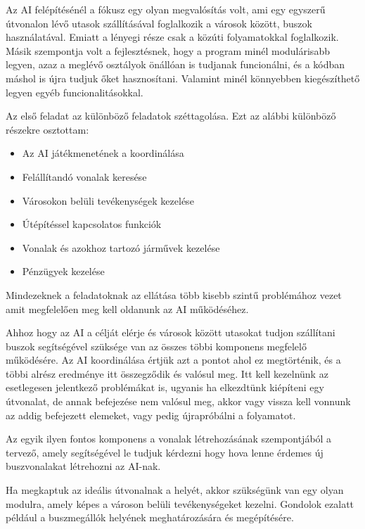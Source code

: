 
Az AI felépítésénél a fókusz egy olyan megvalósítás volt, ami egy egyszerű útvonalon lévő utasok szállításával foglalkozik a városok között, buszok használatával. Emiatt a lényegi része csak a közúti folyamatokkal foglalkozik. Másik szempontja volt a fejlesztésnek, hogy a program minél modulárisabb legyen, azaz a meglévő osztályok önállóan is tudjanak funcionálni, és a kódban máshol is újra tudjuk őket hasznosítani. Valamint minél könnyebben kiegészíthető legyen egyéb funcionalitásokkal.


Az első feladat az különböző feladatok széttagolása. Ezt az alábbi különböző részekre osztottam:

\begin{itemize}
	\item Az AI játékmenetének a koordinálása
	\item Felállítandó vonalak keresése
	\item Városokon belüli tevékenységek kezelése
	\item Útépítéssel kapcsolatos funkciók
	\item Vonalak és azokhoz tartozó járművek kezelése
	\item Pénzügyek kezelése
\end{itemize}

Mindezeknek a feladatoknak az ellátása több kisebb szintű problémához vezet amit megfelelően meg kell oldanunk az AI működéséhez.

Ahhoz hogy az AI a célját elérje és városok között utasokat tudjon szállítani buszok segítségével szüksége van az összes többi komponens megfelelő működésére. Az AI koordinálása értjük azt a pontot ahol ez megtörténik, és a többi alrész eredménye itt összegződik és valósul meg. Itt kell kezelnünk az esetlegesen jelentkező problémákat is, ugyanis ha elkezdtünk kiépíteni egy útvonalat, de annak befejezése nem valósul meg, akkor vagy vissza kell vonnunk az addig befejezett elemeket, vagy pedig újrapróbálni a folyamatot.

Az egyik ilyen fontos komponens a vonalak létrehozásának szempontjából a tervező, amely segítségével le tudjuk kérdezni hogy hova lenne érdemes új buszvonalakat létrehozni az AI-nak.

Ha megkaptuk az ideális útvonalnak a helyét, akkor szükségünk van egy olyan modulra, amely képes a városon belüli tevékenységeket kezelni. Gondolok ezalatt például a buszmegállók helyének meghatározására és megépítésére.


